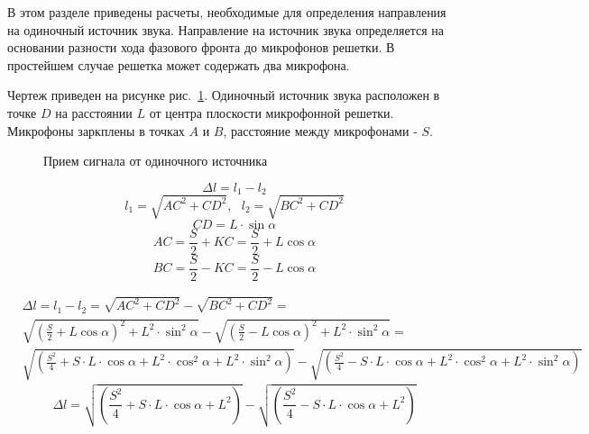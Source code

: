 \documentclass[fleqn,10pt,a4paper]{article}
\begin{document}
В этом разделе приведены расчеты, необходимые для определения направления
на одиночный источник звука. Направление на источник звука определяется на
основании разности хода фазового фронта до микрофонов решетки. В простейшем
случае решетка может содержать два микрофона.

Чертеж приведен на рисунке
рис.~\ref{single_s_src_dir}. Одиночный источник звука расположен в точке $D$ на расстоянии $L$ от центра плоскости микрофонной решетки. Микрофоны заркплены в точках $A$ и $B$, расстояние между микрофонами - $S$.

\begin{figure}[p]
\label{single_s_src_dir}
\caption{Прием сигнала от одиночного источника}
\end{figure}

\begin{equation*}
    \Delta{}l = l_1-l_2
\end{equation*}
\begin{equation*}
    l_1 = \sqrt{AC^2+CD^2},~~~l_2 = \sqrt{BC^2+CD^2}
\end{equation*}
\begin{equation*}
    CD = L\cdot\sin\alpha
\end{equation*}
\begin{equation*}
    AC=\frac{S}{2}+KC=\frac{S}{2}+L\cos\alpha
\end{equation*}
\begin{equation*}
    BC=\frac{S}{2}-KC=\frac{S}{2}-L\cos\alpha
\end{equation*}

\begin{equation*}
\begin{split}
	&\Delta{}l = l_1-l_2=\sqrt{AC^2+CD^2}-\sqrt{BC^2+CD^2}=\\
	&\sqrt{\left(\frac{S}{2}+L\cos\alpha\right)^2+L^2\cdot\sin^2\alpha}-
	\sqrt{\left(\frac{S}{2}-L\cos\alpha\right)^2+L^2\cdot\sin^2\alpha}=\\
	&\sqrt{\left(\frac{S^2}{4}+S\cdot{}L\cdot\cos\alpha+L^2\cdot\cos^2\alpha+L^2\cdot\sin^2\alpha\right)}-
	\sqrt{\left(\frac{S^2}{4}-S\cdot{}L\cdot\cos\alpha+L^2\cdot\cos^2\alpha+L^2\cdot\sin^2\alpha\right)}
\end{split}
\end{equation*}
\begin{equation}
	\boxed{
		\Delta{}l =
		\sqrt{\left(\frac{S^2}{4}+S\cdot{}L\cdot\cos\alpha+L^2\right)}-\sqrt{\left(\frac{S^2}{4}-S\cdot{}L\cdot\cos\alpha+L^2\right)}
	}\label{delta_l_cos_alpha}
\end{equation}
\end{document}
